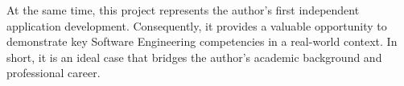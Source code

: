 At the same time, this project represents the author's first independent application development. Consequently, it provides a valuable opportunity to demonstrate key Software Engineering competencies in a real-world context. In short, it is an ideal case that bridges the author's academic background and professional career.

\newpage  
